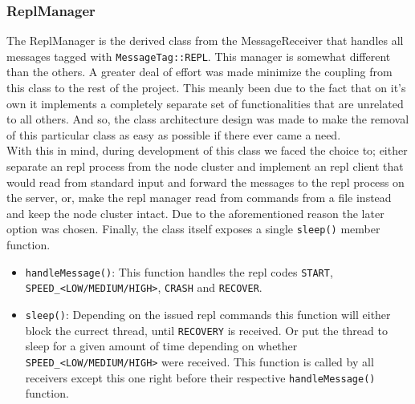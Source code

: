 \documentclass[11pt]{article}
\begin{document}
\subsubsection{ReplManager}
The ReplManager is the derived class from the MessageReceiver that handles all
messages tagged with \texttt{MessageTag::REPL}. This manager is somewhat
different than the others. A greater deal of effort was made minimize the
coupling from this class to the rest of the project. This meanly been due to the
fact that on it's own it implements a completely separate set of functionalities
that are unrelated to all others. And so, the class architecture design was made
to make the removal of this particular class as easy as possible if there ever
came a need.\\ With this in mind, during development of this class we faced the
choice to; either separate an repl process from the node cluster and implement
an repl client that would read from standard input and forward the messages to
the repl process on the server, or, make the repl manager read from commands
from a file instead and keep the node cluster intact. Due to the aforementioned
reason the later option was chosen. Finally, the class itself exposes a single
\texttt{sleep()} member function.\\
\begin{itemize}
\item \texttt{handleMessage()}: This function handles the repl codes
  \texttt{START}, \texttt{SPEED\_<LOW/MEDIUM/HIGH>}, \texttt{CRASH} and
  \texttt{RECOVER}.\\
\item \texttt{sleep()}: Depending on the issued repl commands this function will
  either block the currect thread, until \texttt{RECOVERY} is received. Or put
  the thread to sleep for a given amount of time depending on whether
  \texttt{SPEED\_<LOW/MEDIUM/HIGH>} were received. This function is called by
  all receivers except this one right before their respective
  \texttt{handleMessage()} function.
\end{itemize}
\end{document}
